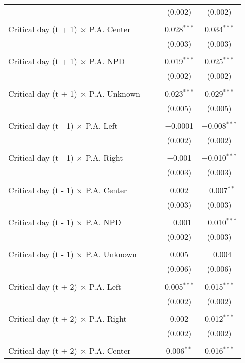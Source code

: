 \documentclass[
]{article}
\begin{document}
\begin{table}[!htbp]
{\begin{tabular}{@{\extracolsep{5pt}}lcccc}
  &  &  & (0.002) & (0.002) \\ 
  & & & & \\ 
 Critical day (t + 1) $\times$ P.A. Center &  &  & 0.028$^{***}$ & 0.034$^{***}$ \\ 
  &  &  & (0.003) & (0.003) \\ 
  & & & & \\ 
 Critical day (t + 1) $\times$ P.A. NPD &  &  & 0.019$^{***}$ & 0.025$^{***}$ \\ 
  &  &  & (0.002) & (0.002) \\ 
  & & & & \\ 
 Critical day (t + 1) $\times$ P.A. Unknown &  &  & 0.023$^{***}$ & 0.029$^{***}$ \\ 
  &  &  & (0.005) & (0.005) \\ 
  & & & & \\ 
 Critical day (t - 1) $\times$ P.A. Left &  &  & $-$0.0001 & $-$0.008$^{***}$ \\ 
  &  &  & (0.002) & (0.002) \\ 
  & & & & \\ 
 Critical day (t - 1) $\times$ P.A. Right &  &  & $-$0.001 & $-$0.010$^{***}$ \\ 
  &  &  & (0.003) & (0.003) \\ 
  & & & & \\ 
 Critical day (t - 1) $\times$ P.A. Center &  &  & 0.002 & $-$0.007$^{**}$ \\ 
  &  &  & (0.003) & (0.003) \\ 
  & & & & \\ 
 Critical day (t - 1) $\times$ P.A. NPD &  &  & $-$0.001 & $-$0.010$^{***}$ \\ 
  &  &  & (0.002) & (0.003) \\ 
  & & & & \\ 
 Critical day (t - 1) $\times$ P.A. Unknown &  &  & 0.005 & $-$0.004 \\ 
  &  &  & (0.006) & (0.006) \\ 
  & & & & \\ 
 Critical day (t + 2) $\times$ P.A. Left &  &  & 0.005$^{***}$ & 0.015$^{***}$ \\ 
  &  &  & (0.002) & (0.002) \\ 
  & & & & \\ 
 Critical day (t + 2) $\times$ P.A. Right &  &  & 0.002 & 0.012$^{***}$ \\ 
  &  &  & (0.002) & (0.002) \\ 
  & & & & \\ 
 Critical day (t + 2) $\times$ P.A. Center &  &  & 0.006$^{**}$ & 0.016$^{***}$ \\ 

\end{tabular}}
\end{table}
\end{document}
